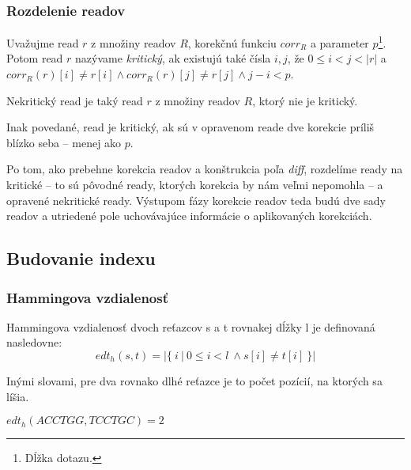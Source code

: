 \subsubsection{Rozdelenie readov}
\begin{defn}
Uvažujme read $r$ z množiny readov $R$, korekčnú funkciu $corr_R$ a parameter $p$\footnote{Dĺžka dotazu.}. Potom read $r$ nazývame \emph{kritický}, ak existujú také čísla $i, j$, že $0 \leq i < j < |r|$ a $corr_R(r)[i] \neq r[i] \wedge corr_R(r)[j] \neq r[j] \wedge j - i < p$.
\end{defn}

\begin{pozn}
Nekritický read je taký read $r$ z množiny readov $R$, ktorý nie je kritický.
\end{pozn}

Inak povedané, read je kritický, ak sú v opravenom reade dve korekcie príliš blízko seba -- menej ako $p$.

Po tom, ako prebehne korekcia readov a konštrukcia poľa \emph{diff}, rozdelíme ready na kritické -- to sú pôvodné ready, ktorých korekcia by nám veľmi nepomohla -- a opravené nekritické ready. Výstupom fázy korekcie readov teda budú dve sady readov a utriedené pole uchovávajúce informácie o aplikovaných korekciách.

\subsection{Budovanie indexu}

\subsubsection{Hammingova vzdialenosť}
\begin{defn}
Hammingova vzdialenosť dvoch reťazcov s a t rovnakej dĺžky l je definovaná nasledovne:
$$
edt_h(s, t) = \left\vert{ \{~i~|~0 \leq i < l~\land s[i] \neq t[i] ~\} }\right\vert
$$
\end{defn}

Inými slovami, pre dva rovnako dlhé reťazce je to počet pozícií, na ktorých sa líšia.

\begin{example}
$edt_h(ACCTGG, TCCTGC) = 2$ 
\end{example}

